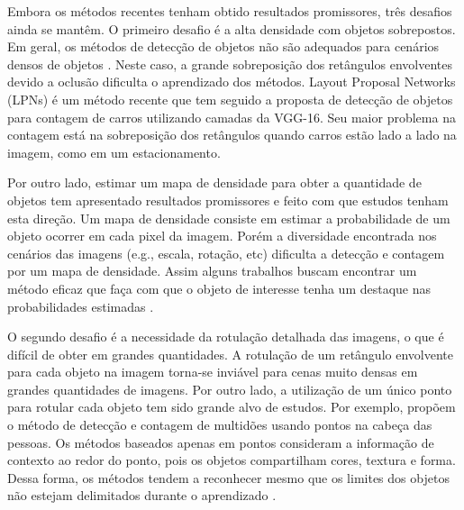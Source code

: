     Embora os métodos recentes tenham obtido resultados promissores, três desafios ainda se mantêm.
    O primeiro desafio é a alta densidade com objetos sobrepostos.
    Em geral, os métodos de detecção de objetos não são adequados para cenários densos de objetos \cite{Goldman2019CVPR}.
    Neste caso, a grande sobreposição dos retângulos envolventes devido a oclusão dificulta o aprendizado dos métodos. Layout Proposal Networks (LPNs) \cite{8237708} é um método recente que tem seguido a proposta de detecção de objetos para contagem de carros utilizando camadas da VGG-16. Seu maior problema na contagem está na sobreposição dos retângulos quando carros estão lado a lado na imagem, como em um estacionamento. 
    
    
    Por outro lado, estimar um mapa de densidade para obter a quantidade de objetos tem apresentado resultados promissores \cite{DBLP:journals/corr/abs-1808-01050,880968,Cao2017} e  feito com que estudos tenham esta direção.
    Um mapa de densidade consiste em estimar a probabilidade de um objeto ocorrer em cada pixel da imagem.
    Porém a diversidade encontrada nos cenários das imagens (e.g., escala, rotação, etc) dificulta a detecção e contagem por um mapa de densidade. Assim alguns trabalhos buscam encontrar um método eficaz que faça com que o objeto de interesse tenha um destaque nas probabilidades estimadas \cite{inproceedings} \cite{DBLP:journals/corr/abs-1711-04433}.
    
    O segundo desafio é a necessidade da rotulação detalhada das imagens, o que é difícil de obter em grandes quantidades. 
    A rotulação de um retângulo envolvente para cada objeto na imagem torna-se inviável para cenas muito densas em grandes quantidades de imagens.
     Por outro lado, a utilização de um único ponto para rotular cada objeto \cite{8237708} tem sido grande alvo de estudos.
     Por exemplo, \cite{DBLP:peri/corr/abs-1904-01333} propõem o método de detecção e contagem de multidões usando pontos na cabeça das pessoas. 
     Os métodos baseados apenas em pontos consideram a informação de contexto ao redor do ponto, pois os objetos compartilham cores, textura e forma.
     Dessa forma, os métodos tendem a reconhecer mesmo que os limites dos objetos não estejam delimitados durante o aprendizado \cite{Aich2018ImprovingOC}.

